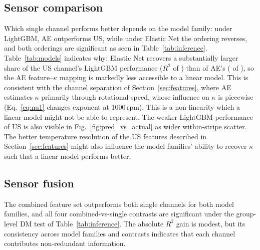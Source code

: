 \begin{table}[H]
\centering
\small
{}%
  {}%
  {%
    {}%
    {}}
\caption{Regression model performance: mean grouped-CV $R^2$ per fold and pooled
held-out $R^2$, MAE, and RMSE. Best pooled $R^2$ in bold.}
\label{tab:models}
\end{table}

\subsection{Sensor comparison}
\label{subsec:sensor_comparison}
Which single channel performs better depends on the model family: under LightGBM, AE outperforms US, while under Elastic Net the ordering reverses, and both orderings are significant as seen in Table~\ref{tab:inference}. Table~\ref{tab:models} indicates why: Elastic Net recovers a substantially larger share of the US channel's LightGBM performance ($R^2$ \resPooledRsqEnetUs{} of \resPooledRsqLgbUs) than of AE's (\resPooledRsqEnetAe{} of \resPooledRsqLgbAe), so the AE feature--$\kappa$ mapping is markedly less accessible to a linear model. This is consistent with the channel separation of Section~\ref{sec:features}, where AE estimates $\kappa$ primarily through rotational speed, whose influence on $\kappa$ is piecewise (Eq.~\eqref{eq:nu1} changes exponent at 1000\,rpm). This is a non-linearity which a linear model might not be able to represent. The weaker LightGBM performance of US is also visible in Fig.~\ref{fig:pred_vs_actual} as wider within-stripe scatter. The better temperature resolution of the US features described in Section~\ref{sec:features} might also influence the model families' ability to recover $\kappa$ such that a linear model performs better.

\subsection{Sensor fusion}
\label{subsec:sensor_fusion}
The combined feature set outperforms both single channels for both model families, and all four combined-vs-single contrasts are significant under the group-level DM test of Table~\ref{tab:inference}. The absolute $R^2$ gain is modest, but its consistency across model families and contrasts indicates that each channel contributes non-redundant information.

